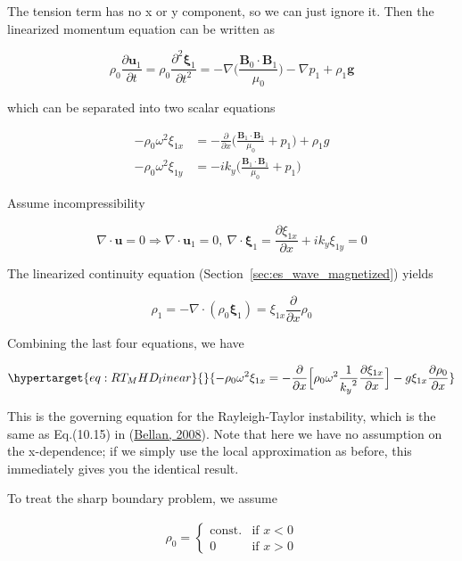 \documentclass[
  notoc %
]{tufte-book}
\begin{document}
The tension term has no x or y component, so we can just ignore it. Then
the linearized momentum equation can be written as

\[
\rho_0\frac{\partial \mathbf{u}_1}{\partial t}=\rho_0\frac{\partial^2\pmb{\xi}_1}{\partial t^2}=-\nabla\Big( \frac{\mathbf{B}_0\cdot\mathbf{B}_1}{\mu_0}\Big) - \nabla p_1 +\rho_1\mathbf{g}
\]

which can be separated into two scalar equations

\[
\begin{aligned}
-\rho_0 \omega^2 \xi_{1x} &= -\frac{\partial}{\partial x}\Big( \frac{\mathbf{B}_1\cdot\mathbf{B}_1}{\mu_0}+p_1 \Big) +\rho_1 g \\
-\rho_0 \omega^2 \xi_{1y} &= -ik_y\Big( \frac{\mathbf{B}_1\cdot\mathbf{B}_1}{\mu_0}+p_1\Big)
\end{aligned}
\]

Assume incompressibility

\[
\nabla\cdot\mathbf{u}=0\Rightarrow \nabla\cdot\mathbf{u}_1=0,\ \nabla\cdot\pmb{\xi}_1=\frac{\partial \xi_{1x}}{\partial x}+ik_y \xi_{1y}=0
\]

The linearized continuity equation
(Section~\ref{sec:es_wave_magnetized}) yields

\[
\rho_1=-\nabla\cdot(\rho_0\pmb{\xi}_1)=\xi_{1x}\frac{\partial}{\partial x}\rho_0
\]

Combining the last four equations, we have

\begin{equation}\protect\hypertarget{eq:RT_MHD_linear}{}{
-\rho_0\omega^2 \xi_{1x} = -\frac{\partial}{\partial x}\Big[ \rho_0\omega^2 \frac{1}{{k_y}^2}\frac{\partial \xi_{1x}}{\partial x}\Big] - g\xi_{1x}\frac{\partial \rho_0}{\partial x}
}\label{eq:RT_MHD_linear}\end{equation}

This is the governing equation for the Rayleigh-Taylor instability,
which is the same as Eq.(10.15) in
(\protect\hyperlink{ref-bellan2008fundamentals}{Bellan, 2008}). Note
that here we have no assumption on the x-dependence; if we simply use
the local approximation as before, this immediately gives you the
identical result.

To treat the sharp boundary problem, we assume

\[
\begin{aligned}
\rho_0= \left\{
\begin{array}{rl}
\textrm{const.} & \text{if } x<0 \\
0 & \text{if } x>0
\end{array} \right.
\end{aligned}
\]
\end{document}
